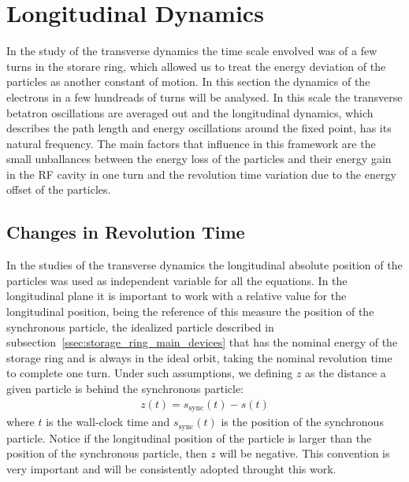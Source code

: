 \documentclass[
	12pt,				%
	openright,			%
	oneside,			%
	a4paper,		%
	chapter=TITLE,		%
	section=TITLE,		%
    brazil,				%
	english,			%
	sumario=tradicional,
	]{abntex2}
\begin{document}
  \section{Longitudinal Dynamics}

  In the study of the transverse dynamics the time scale envolved was of a few turns in the storare ring, which allowed us to treat the energy deviation of the particles as another constant of motion. In this section the dynamics of the electrons in a few hundreads of turns will be analysed. In this scale the transverse betatron oscillations are averaged out and the longitudinal dynamics, which describes the path length and energy oscillations around the fixed point, has its natural frequency. The main factors that influence in this framework are the small unballances between the energy loss of the particles and their energy gain in the RF cavity in one turn and the revolution time variation due to the energy offset of the particles.

    \subsection{Changes in Revolution Time}\label{sec:longitudinal_deviations}

	In the studies of the transverse dynamics the longitudinal absolute position of the particles was used as independent variable for all the equations. In the longitudinal plane it is important to work with a relative value for the longitudinal position, being the reference of this measure the position of the synchronous particle, the idealized particle described in subsection~\ref{ssec:storage_ring_main_devices} that has the nominal energy of the storage ring and is always in the ideal orbit, taking the nominal revolution time to complete one turn. Under such assumptions, we defining $z$ as the distance a given particle is behind the synchronous particle:
	\begin{align}\label{eq:longitudinal_deviations}
		z(t) = s_\text{sync}(t) - s(t)
	\end{align}
	where $t$ is the wall-clock time and $s_\text{sync}(t)$ is the position of the synchronous particle. Notice if the longitudinal position of the particle is larger than the position of the synchronous particle, then $z$ will be negative. This convention is very important and will be consistently adopted throught this work.
\end{document}
